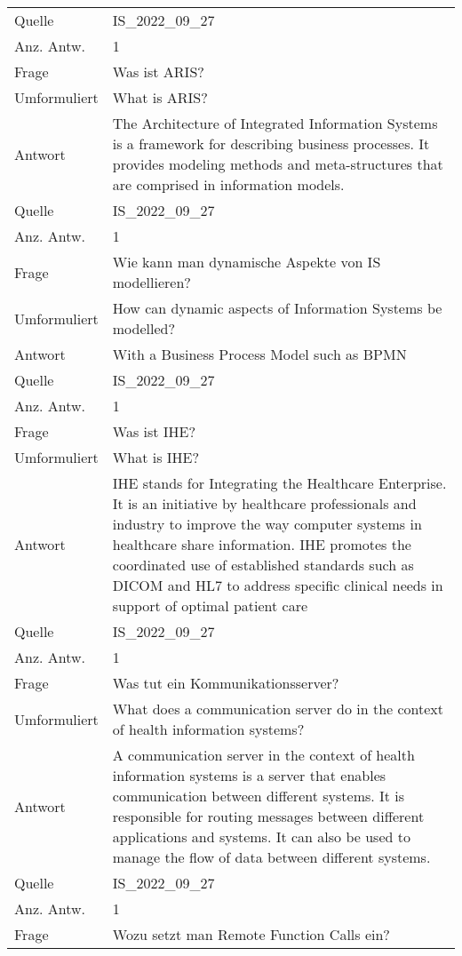\begin{landscape}
\begin{longtable}{p{3cm}p{}}
    Quelle & IS\_2022\_09\_27 \\
    Anz. Antw.& 1 \\
    \midrule
    Frage & Was ist ARIS? \\
    Umformuliert & What is ARIS? \\
    Antwort & The Architecture of Integrated Information Systems is a framework for describing business processes.
    It provides modeling methods and meta-structures that are comprised in information models.\\
    Quelle & IS\_2022\_09\_27 \\
    Anz. Antw.& 1 \\
    \midrule
    Frage & Wie kann man dynamische Aspekte von IS modellieren? \\
    Umformuliert & How can dynamic aspects of Information Systems be modelled? \\
    Antwort & With a Business Process Model such as BPMN \\
    Quelle & IS\_2022\_09\_27 \\
    Anz. Antw.& 1 \\
    \midrule
    Frage & Was ist IHE? \\
    Umformuliert & What is IHE? \\
    Antwort & IHE stands for Integrating the Healthcare Enterprise.
    It is an initiative by healthcare professionals and industry to improve the way computer systems in healthcare share information.
    IHE promotes the coordinated use of established standards such as DICOM and HL7 to address specific clinical needs in support of optimal patient care \\
    Quelle & IS\_2022\_09\_27 \\
    Anz. Antw.& 1 \\
    \midrule
    Frage & Was tut ein Kommunikationsserver? \\
    Umformuliert & What does a communication server do  in the context of health information systems? \\
    Antwort & A communication server in the context of health information systems is a server that enables communication between different systems.
    It is responsible for routing messages between different applications and systems.
    It can also be used to manage the flow of data between different systems.\\
    Quelle & IS\_2022\_09\_27 \\
    Anz. Antw.& 1 \\
    \midrule
    Frage & Wozu setzt man Remote Function Calls ein? \\

\end{longtable}
\end{landscape}
